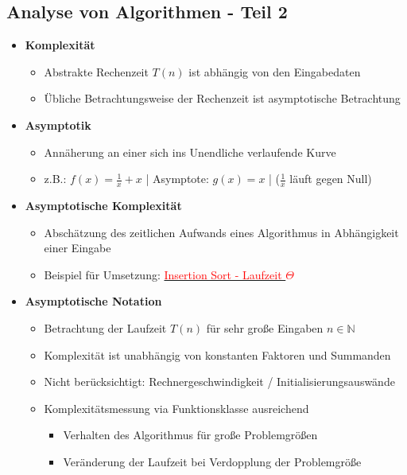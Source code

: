 \subsection{Analyse von Algorithmen - Teil 2}
    \begin{itemize}
        \item \textbf{Komplexität}
            \begin{itemize}
                \item Abstrakte Rechenzeit $T(n)$ ist abhängig von den Eingabedaten
                \item Übliche Betrachtungsweise der Rechenzeit ist asymptotische Betrachtung
            \end{itemize}
        
        \item \textbf{Asymptotik}
            \begin{itemize}
                \item Annäherung an einer sich ins Unendliche verlaufende Kurve
                \item z.B.: $f(x) = \frac{1}{x} + x$ | Asymptote: $g(x)=x$ | ($\frac{1}{x}$ läuft gegen Null)
            \end{itemize}
        
        \item \textbf{Asymptotische Komplexität}
            \begin{itemize}
                \item Abschätzung des zeitlichen Aufwands eines Algorithmus in Abhängigkeit einer Eingabe
                \item Beispiel für Umsetzung: \hyperref[insSortLaufzeitTheta]{\textcolor{red}{Insertion Sort - Laufzeit $\Theta$}}
            \end{itemize}

        \item \textbf{Asymptotische Notation}
            \begin{itemize}
                \item Betrachtung der Laufzeit $T(n)$ für sehr gro\ss e Eingaben $n \in \mathbb{N}$
                \item Komplexität ist unabhängig von konstanten Faktoren und Summanden
                \item Nicht berücksichtigt: Rechnergeschwindigkeit / Initialisierungsauswände
                \item Komplexitätsmessung via Funktionsklasse ausreichend
                    \begin{itemize}
                        \item Verhalten des Algorithmus für gro\ss e Problemgrö\ss en
                        \item Veränderung der Laufzeit bei Verdopplung der Problemgrö\ss e
                    \end{itemize}
            \end{itemize}
        

\end{itemize}
